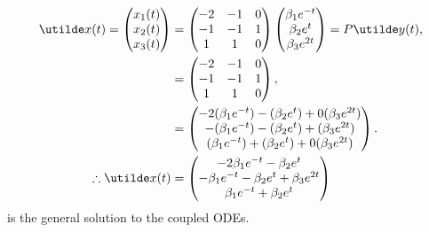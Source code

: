 \documentclass[a4paper,12pt]{report}
\begin{document}
\begin{align*}
  \ut{x}(t) = \begin{pmatrix} x_1(t) \\ x_2(t) \\ x_3(t) \end{pmatrix} &= \begin{pmatrix} -2 & -1 & 0 \\ -1 & -1 & 1 \\ 1 & 1 & 0 \end{pmatrix} \begin{pmatrix} \beta_1e^{-t} \\ \beta_2e^t \\ \beta_3e^{2t} \end{pmatrix} = P\ut{y}(t), \\
     &= \begin{pmatrix} -2 & -1 & 0 \\ -1 & -1 & 1 \\ 1 & 1 & 0 \end{pmatrix}, \\
     &= \begin{pmatrix} -2(\beta_1e^{-t}) - (\beta_2e^t) + 0(\beta_3e^{2t}) \\ -(\beta_1e^{-t}) - (\beta_2e^t) + (\beta_3e^{2t}) \\ (\beta_1e^{-t}) + (\beta_2e^t) + 0(\beta_3e^{2t}) \end{pmatrix}. \\
    \tf\ut{x}(t) &= \begin{pmatrix} -2\beta_1e^{-t} - \beta_2e^t \\ -\beta_1e^{-t} - \beta_2e^t + \beta_3e^{2t} \\ \beta_1e^{-t} + \beta_2e^t \end{pmatrix}
\end{align*}
is the general solution to the coupled ODEs.
\end{document}
